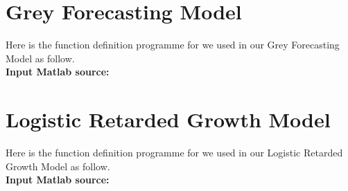 \documentclass[tcn = 45538, sheet = true, abstract = true]{mcmthesis}
\begin{document}
\newpage
\begin{appendices}

\section{Grey Forecasting Model}
\hspace{1.5 em} Here is the function definition programme for we used in our Grey Forecasting Model as follow. \\

\textbf{\textcolor[rgb]{0.98,0.00,0.00}{Input Matlab source:}}

\label{lst:greyForecastingModel}

\section{Logistic Retarded Growth Model}

\hspace{1.5 em} Here is the function definition programme for we used in our Logistic Retarded Growth Model as follow. \\

\textbf{\textcolor[rgb]{0.98,0.00,0.00}{Input Matlab source:}}

\label{lst:logisticRetardedGrowthModel}

\end{appendices}
\end{document}

